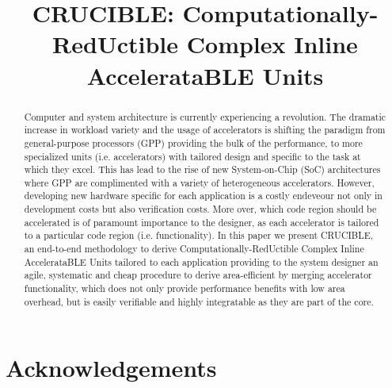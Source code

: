 \documentclass{sig-alternate}
\title{CRUCIBLE: Computationally-RedUctible Complex Inline AccelerataBLE Units}
\begin{document}
\maketitle
\thispagestyle{firstpage}
\pagestyle{plain}




\begin{abstract}

Computer and system architecture is currently experiencing a revolution. The dramatic
increase in workload variety and the usage of accelerators is shifting the paradigm from general-purpose
processors (GPP) providing the bulk of the performance, to more specialized units (i.e. accelerators) with tailored
design and specific to the task at which they excel. This has lead to the rise of new System-on-Chip (SoC) architectures
where GPP are complimented with a variety of heterogeneous accelerators. However, developing new hardware specific
for each application is a costly endeveour not only in development costs but also verification costs. More over, which
code region should be accelerated is of paramount importance to the designer, as each accelerator is tailored to a particular code region (i.e. functionality).
In this paper we present CRUCIBLE, an end-to-end methodology to derive Computationally-RedUctible Complex Inline AccelerataBLE Units
tailored to each application providing to the system designer an agile, systematic and cheap procedure to derive area-efficient by merging 
accelerator functionality, which does not only provide performance benefits with low area overhead, but is easily verifiable and highly integratable as they 
are part of the core.

\end{abstract}


\section{Acknowledgements}






\end{document}
